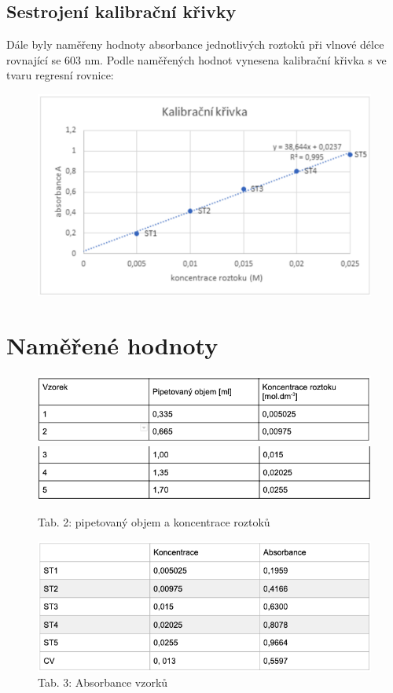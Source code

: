 \documentclass[13pt, a4paper, twoside]{article}
\begin{document}
    \subsection*{Sestrojení kalibrační křivky}
    Dále byly naměřeny hodnoty absorbance jednotlivých roztoků při vlnové délce rovnající se 603 nm. Podle naměřených hodnot vynesena kalibrační křivka s ve tvaru regresní rovnice:
    \begin{figure}[H]
        \centering
        \includegraphics[width=6.5in]{uloha_5_graf_2.png}
    \end{figure}

    \section*{Naměřené hodnoty}
    \begin{figure}[H]
        \centering
        \includegraphics[width=6.5in]{uloha_5_tab_2.png}
        \includegraphics[width=6.5in]{uloha_5_tab_3.png}
        \caption*{Tab. 2: pipetovaný objem a koncentrace roztoků}
    \end{figure}

    \begin{figure}[H]
        \centering
        \includegraphics[width=6.5in]{uloha_5_tab_4.png}
        \caption*{Tab. 3: Absorbance vzorků}
    \end{figure}
\end{document}
